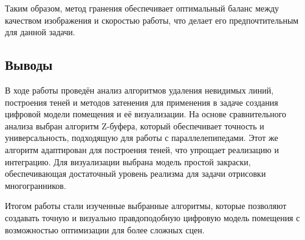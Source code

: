 Таким образом, метод гранения обеспечивает оптимальный баланс между качеством изображения и скоростью работы, что делает его предпочтительным для данной задачи.


\subsection{Выводы}

\hspace{1.25cm}
В ходе работы проведён анализ алгоритмов удаления невидимых линий, построения теней и методов затенения для применения в задаче создания цифровой модели помещения и её визуализации. На основе сравнительного анализа выбран алгоритм Z-буфера, который обеспечивает точность и универсальность, подходящую для работы с параллелепипедами. Этот же алгоритм адаптирован для построения теней, что упрощает реализацию и интеграцию. Для визуализации выбрана модель простой закраски, обеспечивающая достаточный уровень реализма для задачи отрисовки многогранников.

Итогом работы стали изученные выбранные алгоритмы, которые позволяют создавать точную и визуально правдоподобную цифровую модель помещения с возможностью оптимизации для более сложных сцен.


\newpage